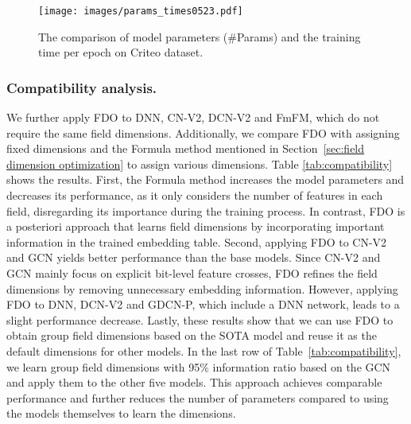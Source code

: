 \documentclass[sigconf]{acmart}
\begin{document}
\begin{figure}[t]
\setlength{\abovecaptionskip}{0.2cm}
\setlength{\belowcaptionskip}{-0.2cm}
    \centering
    \texttt{[image: images/params\_times0523.pdf]}
    \caption{The comparison of model parameters (\#Params) and the training time per epoch on Criteo dataset.}
\label{fig:auc_params}
\end{figure}

\subsubsection{Compatibility analysis.} We further apply FDO to DNN, CN-V2, DCN-V2 and FmFM, which do not require the same field dimensions. Additionally, we compare FDO with assigning fixed dimensions and the Formula method mentioned in Section~\ref{sec:field dimension optimization} to assign various dimensions. Table \ref{tab:compatibility} shows the results. First, the Formula method increases the model parameters and decreases its performance, as it only considers the number of features in each field, disregarding its importance during the training process. In contrast, FDO is a posteriori approach that learns field dimensions by incorporating important information in the trained embedding table. Second, applying FDO to CN-V2 and GCN yields better performance than the base models. Since CN-V2 and GCN mainly focus on explicit bit-level feature crosses, FDO refines the field dimensions by removing unnecessary embedding information. However, applying FDO to DNN, DCN-V2 and GDCN-P, which include a DNN network, leads to a slight performance decrease. Lastly, these results show that we can use FDO to obtain group field dimensions based on the SOTA model and reuse it as the default dimensions for other models. In the last row of Table~\ref{tab:compatibility}, we learn group field dimensions with 95\% information ratio based on the GCN and apply them to the other five models. This approach achieves comparable performance and further reduces the number of parameters compared to using the models themselves to learn the dimensions. 
\end{document}
